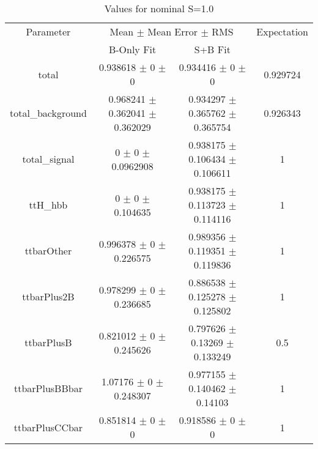 \begin{table}
\centering
\caption{Values for nominal S=1.0}
\begin{tabular}{cccc}
\toprule
Parameter & \multicolumn{2}{c}{Mean $\pm$ Mean Error $\pm$ RMS} & Expectation\\
 & B-Only Fit & S+B Fit & \\
\midrule
total & \num{0.938618} $\pm$ \num{0} $\pm$ \num{0} & \num{0.934416} $\pm$ \num{0} $\pm$ \num{0} & \num{0.929724}\\
total\_background & \num{0.968241} $\pm$ \num{0.362041} $\pm$ \num{0.362029} & \num{0.934297} $\pm$ \num{0.365762} $\pm$ \num{0.365754} & \num{0.926343}\\
total\_signal & \num{0} $\pm$ \num{0} $\pm$ \num{0.0962908} & \num{0.938175} $\pm$ \num{0.106434} $\pm$ \num{0.106611} & \num{1}\\
ttH\_hbb & \num{0} $\pm$ \num{0} $\pm$ \num{0.104635} & \num{0.938175} $\pm$ \num{0.113723} $\pm$ \num{0.114116} & \num{1}\\
ttbarOther & \num{0.996378} $\pm$ \num{0} $\pm$ \num{0.226575} & \num{0.989356} $\pm$ \num{0.119351} $\pm$ \num{0.119836} & \num{1}\\
ttbarPlus2B & \num{0.978299} $\pm$ \num{0} $\pm$ \num{0.236685} & \num{0.886538} $\pm$ \num{0.125278} $\pm$ \num{0.125802} & \num{1}\\
ttbarPlusB & \num{0.821012} $\pm$ \num{0} $\pm$ \num{0.245626} & \num{0.797626} $\pm$ \num{0.13269} $\pm$ \num{0.133249} & \num{0.5}\\
ttbarPlusBBbar & \num{1.07176} $\pm$ \num{0} $\pm$ \num{0.248307} & \num{0.977155} $\pm$ \num{0.140462} $\pm$ \num{0.14103} & \num{1}\\
ttbarPlusCCbar & \num{0.851814} $\pm$ \num{0} $\pm$ \num{0} & \num{0.918586} $\pm$ \num{0} $\pm$ \num{0} & \num{1}\\
\bottomrule
\end{tabular}
\end{table}
